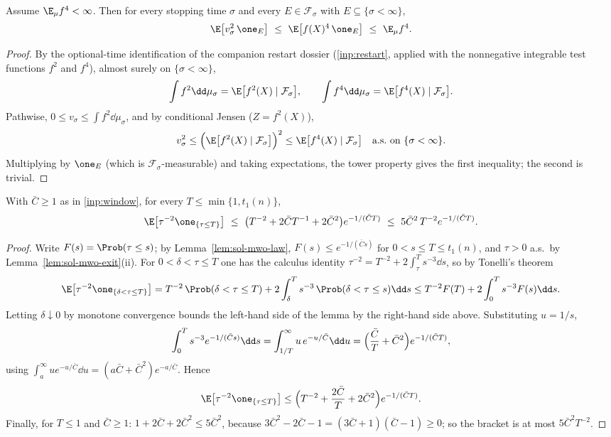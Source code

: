 \documentclass[../main.tex]{subfiles}
\begin{document}
\begin{lemma}
\label{lem:sol-mwo-optional-projection}
Assume $\E_\mu f^4<\infty$.  Then for every stopping time $\sigma$ and every
$E\in\mathcal F_\sigma$ with $E\subseteq\{\sigma<\infty\}$,
\[
  \E\bigl[v_\sigma^2\,\one_E\bigr]\ \le\ \E\bigl[f(X)^4\,\one_E\bigr]
  \ \le\ \E_\mu f^4 .
\]
\end{lemma}

\begin{proof}
By the optional-time identification of the companion restart dossier
(\ref{inp:restart}, applied with the nonnegative integrable test functions $f^2$ and
$f^4$), almost surely on $\{\sigma<\infty\}$,
\[
  \int f^2\dd\mu_\sigma=\E\bigl[f^2(X)\mid\mathcal F_\sigma\bigr],
  \qquad
  \int f^4\dd\mu_\sigma=\E\bigl[f^4(X)\mid\mathcal F_\sigma\bigr].
\]
Pathwise, $0\le v_\sigma\le\int f^2\dd\mu_\sigma$, and by conditional Jensen
($Z=f^2(X)$),
\[
  v_\sigma^2\le\Bigl(\E\bigl[f^2(X)\mid\mathcal F_\sigma\bigr]\Bigr)^2
  \le\E\bigl[f^4(X)\mid\mathcal F_\sigma\bigr]
  \quad\text{a.s.\ on }\{\sigma<\infty\}.
\]
Multiplying by $\one_E$ (which is $\mathcal F_\sigma$-measurable) and taking
expectations, the tower property gives the first inequality; the second is trivial.
\end{proof}

\begin{lemma}
\label{lem:sol-mwo-tail}
With $\bar C\ge1$ as in \ref{inp:window}, for every
$T\le\min\{1,t_1(n)\}$,
\[
  \E\bigl[\tau^{-2}\one_{\{\tau\le T\}}\bigr]
  \ \le\ \bigl(T^{-2}+2\bar CT^{-1}+2\bar C^2\bigr)e^{-1/(\bar CT)}
  \ \le\ 5\bar C^2\,T^{-2}e^{-1/(\bar CT)} .
\]
\end{lemma}

\begin{proof}
Write $F(s)=\Prob(\tau\le s)$; by Lemma~\ref{lem:sol-mwo-law},
$F(s)\le e^{-1/(\bar Cs)}$ for $0<s\le T\le t_1(n)$, and $\tau>0$ a.s.\ by
Lemma~\ref{lem:sol-mwo-exit}(ii).  For $0<\delta<\tau\le T$ one has the calculus
identity $\tau^{-2}=T^{-2}+2\int_\tau^Ts^{-3}\dd s$, so by Tonelli's theorem
\[
  \E\bigl[\tau^{-2}\one_{\{\delta<\tau\le T\}}\bigr]
  =T^{-2}\,\Prob(\delta<\tau\le T)
  +2\int_\delta^Ts^{-3}\,\Prob(\delta<\tau\le s)\dd s
  \le T^{-2}F(T)+2\int_0^Ts^{-3}F(s)\dd s .
\]
Letting $\delta\downarrow0$ by monotone convergence bounds the left-hand side of the
lemma by the right-hand side above.  Substituting $u=1/s$,
\[
  \int_0^Ts^{-3}e^{-1/(\bar Cs)}\dd s
  =\int_{1/T}^\infty u\,e^{-u/\bar C}\dd u
  =\Bigl(\frac{\bar C}{T}+\bar C^2\Bigr)e^{-1/(\bar CT)},
\]
using $\int_a^\infty ue^{-u/\bar C}\dd u=(a\bar C+\bar C^2)e^{-a/\bar C}$.  Hence
\[
  \E\bigl[\tau^{-2}\one_{\{\tau\le T\}}\bigr]
  \le\Bigl(T^{-2}+\frac{2\bar C}T+2\bar C^2\Bigr)e^{-1/(\bar CT)} .
\]
Finally, for $T\le1$ and $\bar C\ge1$:
$1+2\bar C+2\bar C^2\le5\bar C^2$, because
$3\bar C^2-2\bar C-1=(3\bar C+1)(\bar C-1)\ge0$; so the bracket is at most
$5\bar C^2T^{-2}$.
\end{proof}
\end{document}
